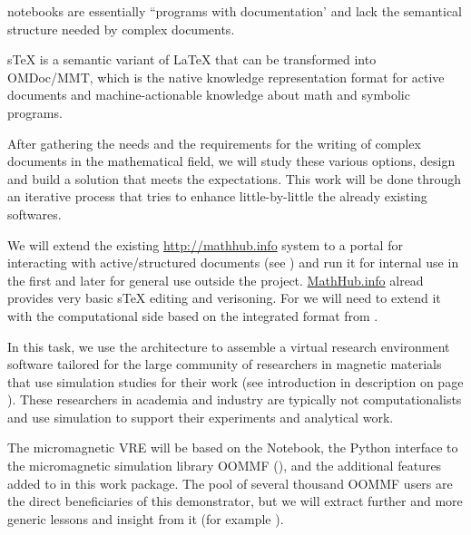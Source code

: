 \begin{workpackage}
\begin{tasklist}
\begin{task}[title=Structured documents,id=structdocs,lead=JU,PM=24,lead=JU,partners={SR,USH}]
\begin{compactitem}
  \item  \Jupyter notebooks are essentially ``programs with
    documentation' and lack the semantical structure needed by complex
    documents.

  \item  sTeX is a semantic variant of LaTeX that can be transformed into
    OMDoc/MMT, which is the native knowledge representation format for
    active documents and machine-actionable knowledge about math and
    symbolic programs.

  \end{compactitem}

  After gathering the needs and the requirements for the writing of complex
  documents in the mathematical field, we will study these various options,
  design and build a solution that meets the expectations. This work will be
  done through an iterative process that tries to enhance little-by-little the
  already existing softwares.

\end{task}

\begin{task}[id=mathhub,title=Active Documents Portal,lead=JU,PM=12]
  We will extend the existing \url{http://mathhub.info} system to a portal for
  interacting with active/structured documents (see ) and run it
  for internal use in the \TheProject first and later for general use outside the
  project. \url{MathHub.info} alread provides very basic sTeX editing and verisoning. For
  \TheProject we will need to extend it with the computational side based on the
  integrated format from .
\end{task}


\begin{task}[lead=USO,title=Case study: micromagnetic VRE built from
  \TheProject,id=oommf-py-ipython-attributes,PM=6,partners={SR,USH}]

  In this task, we use the \TheProject architecture to assemble a
  virtual research environment software tailored for the large
  community of researchers in magnetic materials that use simulation
  studies for their work (see introduction in description on page
  \pageref{page:description-of-micromagnetic-vre}). These researchers in
  academia and industry are typically not computationalists and use
  simulation to support their experiments and analytical work.

  The micromagnetic VRE will be based on the \Jupyter Notebook, the
  Python interface to the micromagnetic simulation library OOMMF
  (),
  and the additional features added to \Jupyter in this work
  package. The pool of several thousand OOMMF users are the direct
  beneficiaries of this demonstrator, but we will extract further and
  more generic lessons and insight from it (for example
  ).


\end{task}
\end{tasklist}
\end{workpackage}
